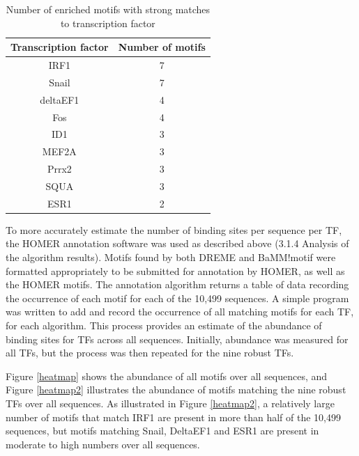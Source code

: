\documentclass[12pt]{article}
\begin{document}
\begin{table}[!htbp]
\caption{Number of enriched motifs with strong matches to transcription factor}
\label{totalMotifs}
\centering
\begin{tabular}{cc}
\toprule[0.2em]
Transcription factor & Number of motifs\\
\midrule[0.1em]
IRF1             & 7\\
Snail             & 7\\
deltaEF1      & 4\\
Fos           &   4\\
ID1            & 3\\
MEF2A       & 3\\
Prrx2        &  3\\
SQUA       &  3\\
ESR1       &  2\\
\bottomrule[0.2em]
\end{tabular}
\end{table}
\newpage
To more accurately estimate the number of binding sites per sequence per TF, the HOMER annotation software was used as described above (3.1.4 Analysis of the algorithm results). Motifs found by both DREME and BaMM!motif were formatted appropriately to be submitted for annotation by HOMER, as well as the HOMER motifs. The annotation algorithm returns a table of data recording the occurrence of each motif for each of the 10,499 sequences. A simple program was written to add and record the occurrence of all matching motifs for each TF, for each algorithm. This process provides an estimate of the abundance of binding sites for TFs across all sequences. Initially, abundance was measured for all TFs, but the process was then repeated for the nine robust TFs. 

Figure \ref{heatmap} shows the abundance of all motifs over all sequences, and Figure \ref{heatmap2} illustrates the abundance of motifs matching the nine robust TFs over all sequences. As illustrated in Figure \ref{heatmap2}, a relatively large number of motifs that match IRF1 are present in more than half of the 10,499 sequences, but motifs matching Snail, DeltaEF1 and ESR1 are present in moderate to high numbers over all sequences. 
\end{document}
